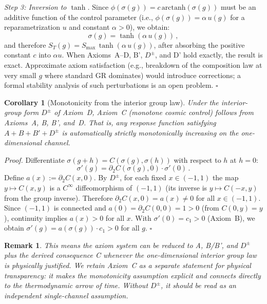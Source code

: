 \documentclass[aps,prd,twocolumn,superscriptaddress,nofootinbib]{revtex4-2}
\newtheorem{corollary}{Corollary}
\newtheorem{remark}{Remark}
\begin{document}
\textit{Step 3: Inversion to $\tanh$.}
Since $\phi(\sigma(g)) = c\,\mathrm{arctanh}(\sigma(g))$ must be an additive function of the control parameter (i.e., $\phi(\sigma(g)) = \alpha\,u(g)$ for a reparametrization $u$ and constant $\alpha > 0$), we obtain:
\begin{equation}
\sigma(g) = \tanh(\alpha\,u(g))\,,
\end{equation}
and therefore $S_T(g) = S_{\max}\,\tanh(\alpha\,u(g))$, after absorbing the positive constant $c$ into $\alpha u$. When Axioms~A--D, B', $D^\pm$, and D' hold exactly, the result is exact. Approximate axiom satisfaction (e.g., breakdown of the composition law at very small $g$ where standard GR dominates) would introduce corrections; a formal stability analysis of such perturbations is an open problem. \hfill $\square$

\begin{corollary}[Monotonicity from the interior group law]
\label{cor:monotonicity}
Under the interior-group form $D^\pm$ of Axiom~D, Axiom~C (monotone cosmic control) follows from Axioms~A, B, B', and~D. That is, any response function satisfying $A + B + B' + D^\pm$ is automatically strictly monotonically increasing on the one-dimensional channel.
\end{corollary}

\textit{Proof.} Differentiate $\sigma(g + h) = C(\sigma(g), \sigma(h))$ with respect to $h$ at $h = 0$:
\[
\sigma'(g) = \partial_2 C(\sigma(g), 0) \cdot \sigma'(0)\,.
\]
Define $a(x) := \partial_2 C(x, 0)$. By $D^\pm$, for each fixed $x \in (-1,1)$ the map $y \mapsto C(x,y)$ is a $C^\infty$ diffeomorphism of $(-1,1)$ (its inverse is $y \mapsto C(-x, y)$ from the group inverse). Therefore $\partial_2 C(x, 0) = a(x) \neq 0$ for all $x \in (-1,1)$. Since $(-1,1)$ is connected and $a(0) = \partial_2 C(0,0) = 1 > 0$ (from $C(0,y) = y$), continuity implies $a(x) > 0$ for all $x$. With $\sigma'(0) = c_1 > 0$ (Axiom~B), we obtain $\sigma'(g) = a(\sigma(g)) \cdot c_1 > 0$ for all $g$. \hfill $\square$

\begin{remark}
This means the axiom system can be reduced to A, B/B', and $D^\pm$ plus the derived consequence C whenever the one-dimensional interior group law is physically justified. We retain Axiom~C as a separate statement for physical transparency: it makes the monotonicity assumption explicit and connects directly to the thermodynamic arrow of time. Without $D^\pm$, it should be read as an independent single-channel assumption.
\end{remark}
\end{document}
